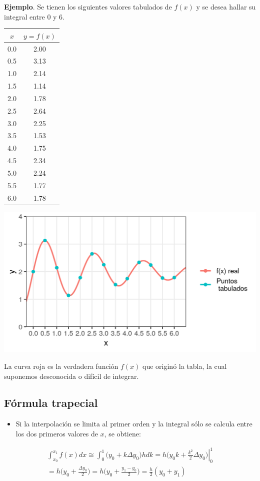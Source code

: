 \documentclass[openany]{book}
\providecommand{\tightlist}{%
  \setlength{\itemsep}{0pt}\setlength{\parskip}{0pt}}
\begin{document}
\textbf{Ejemplo}. Se tienen los siguientes valores tabulados de \(f(x)\) y se desea hallar su integral entre 0 y 6.

\begin{longtable}[]{@{}cc@{}}
\toprule
\(x\) & \(y=f(x)\)\tabularnewline
\midrule
\endhead
0.0 & 2.00\tabularnewline
0.5 & 3.13\tabularnewline
1.0 & 2.14\tabularnewline
1.5 & 1.14\tabularnewline
2.0 & 1.78\tabularnewline
2.5 & 2.64\tabularnewline
3.0 & 2.25\tabularnewline
3.5 & 1.53\tabularnewline
4.0 & 1.75\tabularnewline
4.5 & 2.34\tabularnewline
5.0 & 2.24\tabularnewline
5.5 & 1.77\tabularnewline
6.0 & 1.78\tabularnewline
\bottomrule
\end{longtable}

\begin{center}\includegraphics[width=1\linewidth]{Plots/U4/Unidad4_2_g} \end{center}

La curva roja es la verdadera función \(f(x)\) que originó la tabla, la cual suponemos desconocida o difícil de integrar.

\hypertarget{fuxf3rmula-trapecial}{%
\subsection{Fórmula trapecial}\label{fuxf3rmula-trapecial}}

\begin{itemize}
\tightlist
\item
  Si la interpolación se limita al primer orden y la integral sólo se calcula entre los dos primeros valores de \(x\), se obtiene:
\end{itemize}

\begin{gather*}
\int_{x_0}^{x_1} f(x)dx \cong  \int_{0}^{1} \Big( y_0 + k \Delta y_0 \Big) hdk = h \left. \Big( y_0 k + \frac{k^2}{2} \Delta y_0 \Big) \right\vert_{0}^{1} \\
= h \Big( y_0 + \frac{\Delta y_0}{2} \Big) = h \Big( y_0 + \frac{y_1 - y_0}{2} \Big) = \frac{h}{2} (y_0 + y_1)
\end{gather*}
\end{document}
